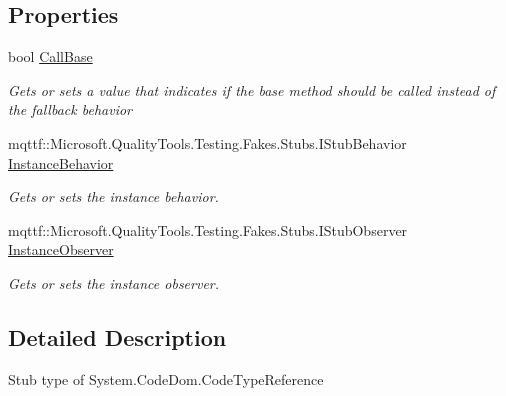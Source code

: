 \subsection*{Properties}
\begin{DoxyCompactItemize}
\item 
bool \hyperlink{class_system_1_1_code_dom_1_1_fakes_1_1_stub_code_type_reference_ae2793226fdd4e07007f96a64479ecb8c}{Call\-Base}
\begin{DoxyCompactList}\small\item\em Gets or sets a value that indicates if the base method should be called instead of the fallback behavior\end{DoxyCompactList}\item 
mqttf\-::\-Microsoft.\-Quality\-Tools.\-Testing.\-Fakes.\-Stubs.\-I\-Stub\-Behavior \hyperlink{class_system_1_1_code_dom_1_1_fakes_1_1_stub_code_type_reference_ab5a79d71b79b09c30ee4df5ae434fdef}{Instance\-Behavior}
\begin{DoxyCompactList}\small\item\em Gets or sets the instance behavior.\end{DoxyCompactList}\item 
mqttf\-::\-Microsoft.\-Quality\-Tools.\-Testing.\-Fakes.\-Stubs.\-I\-Stub\-Observer \hyperlink{class_system_1_1_code_dom_1_1_fakes_1_1_stub_code_type_reference_a48255433d9c47467a8fbcfb77ae65b74}{Instance\-Observer}
\begin{DoxyCompactList}\small\item\em Gets or sets the instance observer.\end{DoxyCompactList}\end{DoxyCompactItemize}


\subsection{Detailed Description}
Stub type of System.\-Code\-Dom.\-Code\-Type\-Reference



